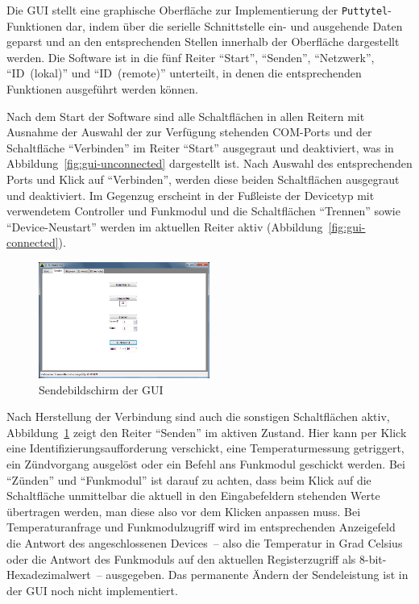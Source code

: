 \documentclass[paper=a4, parskip, numbers=noenddot, toc=listof, headsepline]{scrbook}
\begin{document}
				Die GUI stellt eine graphische Oberfläche zur Implementierung der \texttt{Puttytel}-Funktionen dar, indem über die serielle Schnittstelle ein- und ausgehende Daten geparst und an den entsprechenden Stellen innerhalb der Oberfläche dargestellt werden. Die Software ist in die fünf Reiter \enquote{Start}, \enquote{Senden}, \enquote{Netzwerk}, \enquote{ID~(lokal)} und \enquote{ID~(remote)} unterteilt, in denen die entsprechenden Funktionen ausgeführt werden können.

				Nach dem Start der Software sind alle Schaltflächen in allen Reitern mit Ausnahme der Auswahl der zur Verfügung stehenden COM-Ports und der Schaltfläche \enquote{Verbinden} im Reiter \enquote{Start} ausgegraut und deaktiviert, was in Abbildung~\ref{fig:gui-unconnected} dargestellt ist. Nach Auswahl des entsprechenden Ports und Klick auf \enquote{Verbinden}, werden diese beiden Schaltflächen ausgegraut und deaktiviert. Im Gegenzug erscheint in der Fußleiste der Devicetyp mit verwendetem Controller und Funkmodul und die Schaltflächen \enquote{Trennen} sowie \enquote{Device-Neustart} werden im aktuellen Reiter aktiv (Abbildung~\ref{fig:gui-connected}).%
				\begin{figure}[!b]
					\centering
					\includegraphics[width=0.5\textwidth]{bilder/gui-senden}
					\caption{Sendebildschirm der GUI}
					\label{fig:gui-senden}
				\end{figure}

				Nach Herstellung der Verbindung sind auch die sonstigen Schaltflächen aktiv, Abbildung~\ref{fig:gui-senden} zeigt den Reiter \enquote{Senden} im aktiven Zustand. Hier kann per Klick eine Identifizierungsaufforderung verschickt, eine Temperaturmessung getriggert, ein Zündvorgang ausgelöst oder ein Befehl ans Funkmodul geschickt werden. Bei \enquote{Zünden} und \enquote{Funkmodul} ist darauf zu achten, dass beim Klick auf die Schaltfläche unmittelbar die aktuell in den Eingabefeldern stehenden Werte übertragen werden, man diese also vor dem Klicken anpassen muss. Bei Temperaturanfrage und Funkmodulzugriff wird im entsprechenden Anzeigefeld die Antwort des angeschlossenen Devices~-- also die Temperatur in Grad Celsius oder die Antwort des Funkmoduls auf den aktuellen Registerzugriff als 8-bit-Hexadezimalwert~-- ausgegeben. Das permanente Ändern der Sendeleistung ist in der GUI noch nicht implementiert.
\end{document}
